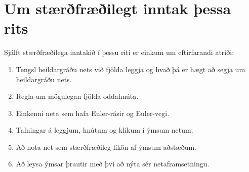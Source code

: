 \documentclass[b5paper,12pt]{book}
\begin{document}
\chapter*{Um stærðfræðilegt inntak þessa rits}
Sjálft stærðfræðilega inntakið í þessu riti er einkum um eftirfarandi atriði:
\begin{enumerate}
\item Tengsl heildargráðu nets við fjölda leggja og hvað þá er hægt að segja um heildargráðu nets.
\item Regla um mögulegan fjölda oddahnúta.
\item Einkenni neta sem hafa Euler-rásir og Euler-vegi.
\item Talningar á leggjum, hnútum og klíkum í ýmsum netum.
\item Að nota net sem stærðfræðileg líkön af ýmsum aðstæðum.
\item Að leysa ýmsar þrautir með því að nýta sér netaframsetningu.
\end{enumerate} 
\end{document}
